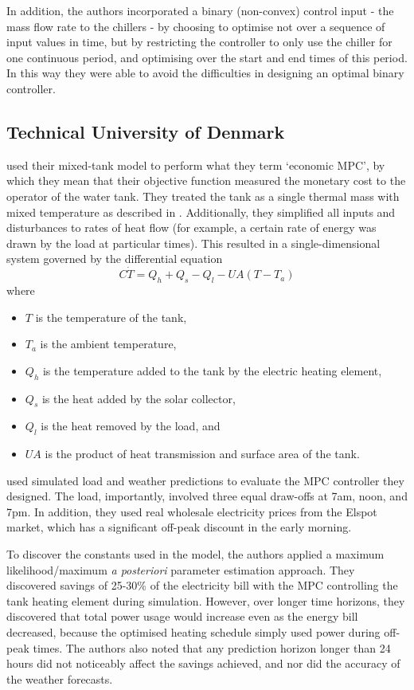 In addition, the authors incorporated a binary (non-convex) control input - the mass flow rate to the chillers - by choosing to optimise not over a sequence of input values in time, but by restricting the controller to only use the chiller for one continuous period, and optimising over the start and end times of this period.
In this way they were able to avoid the difficulties in designing an optimal binary controller.

\subsection{Technical University of Denmark}

\textcite{Halvgaard12} used their mixed-tank model to perform what they term `economic MPC', by which they mean that their objective function measured the monetary cost to the operator of the water tank.
They treated the tank as a single thermal mass with mixed temperature as described in .
Additionally, they simplified all inputs and disturbances to rates of heat flow (for example, a certain rate of energy was drawn by the load at particular times).
This resulted in a single-dimensional system governed by the differential equation
$$ C \dot{T} = Q_h + Q_s - Q_l - U A (T - T_a) $$
where
\begin{itemize}
	\item $T$ is the temperature of the tank,
	\item $T_a$ is the ambient temperature,
	\item $Q_h$ is the temperature added to the tank by the electric heating element,
	\item $Q_s$ is the heat added by the solar collector,
	\item $Q_l$ is the heat removed by the load, and
	\item $U A$ is the product of heat transmission and surface area of the tank.
\end{itemize}

\citeauthor{Halvgaard12} used simulated load and weather predictions to evaluate the MPC controller they designed.
The load, importantly, involved three equal draw-offs at 7am, noon, and 7pm.
In addition, they used real wholesale electricity prices from the Elspot market, which has a significant off-peak discount in the early morning.

To discover the constants used in the model, the authors applied a maximum likelihood/maximum {\it a posteriori} parameter estimation approach.
They discovered savings of 25-30\% of the electricity bill with the MPC controlling the tank heating element during simulation.
However, over longer time horizons, they discovered that total power usage would increase even as the energy bill decreased, because the optimised heating schedule simply used power during off-peak times.
The authors also noted that any prediction horizon longer than 24 hours did not noticeably affect the savings achieved, and nor did the accuracy of the weather forecasts.
